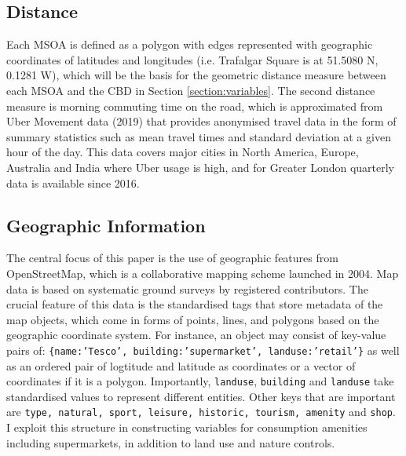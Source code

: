 \documentclass{article}
\begin{document}
\subsection{Distance}
Each MSOA is defined as a polygon with edges represented with geographic coordinates of latitudes and longitudes (i.e. Trafalgar Square is at 51.5080 N, 0.1281 W), which will be the basis for the geometric distance measure between each MSOA and the CBD in Section \ref{section:variables}. The second distance measure is morning commuting time on the road, which is approximated from Uber Movement data (2019) that provides anonymised travel data in the form of summary statistics such as mean travel times and standard deviation at a given hour of the day. This data covers major cities in North America, Europe, Australia and India where Uber usage is high, and for Greater London quarterly data is available since 2016.

\subsection{Geographic Information}
The central focus of this paper is the use of geographic features from OpenStreetMap, which is a collaborative mapping scheme launched in 2004. Map data is based on systematic ground surveys by registered contributors.
The crucial feature of this data is the standardised tags that store metadata of the map objects, which come in forms of points, lines, and polygons based on the geographic coordinate system. For instance, an object may consist of key-value pairs of:  \texttt{\{name:'Tesco', building:'supermarket', landuse:'retail'\}} as well as an ordered pair of logtitude and latitude  as coordinates or a vector of coordinates if it is a polygon. Importantly, \texttt{landuse}, \texttt{building} and \texttt{landuse} take standardised values to represent different entities. Other keys that are important are \texttt{type, natural, sport, leisure, historic, tourism, amenity} and \texttt{shop}. I exploit this structure in constructing variables for consumption amenities including supermarkets, in addition to land use and nature controls.
\end{document}
